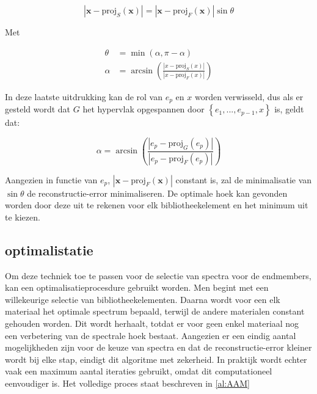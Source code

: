 \documentclass[12pt]{report}
\newcommand{\proj}[2]{\text{proj}_{#2}\left(#1\right)}
\begin{document}
\begin{equation}
\left| \bm{x} - \proj{\bm{x}}{S}\right|  = \left| \bm{x} - \proj{\bm{x}}{F}\right| \sin \theta
\end{equation}

Met 

\begin{align}
\theta &= \min(\alpha, \pi-\alpha) \\
\alpha &= \arcsin \left(\frac{\left|x - \proj{x}{S}\right|}{\left|x - \proj{x}{F}\right|}\right)
\end{align}

In deze laatste uitdrukking kan de rol van $e_p$ en $x$ worden verwisseld, dus als er gesteld wordt dat $G$ het hypervlak opgespannen door $\left\{ e_1 , ... ,e_{p-1}, x \right\}$ is, geldt dat:

\begin{equation}
\alpha = \arcsin \left(\frac{\left|e_p - \proj{e_p}{G}\right|}{\left|e_p - \proj{e_p}{F}\right|}\right)
\end{equation} 

Aangezien in functie van $e_p$, $\left| \bm{x} - \proj{\bm{x}}{F}\right|$ constant is, zal de minimalisatie van $\sin \theta$ de reconstructie-error minimaliseren. De optimale hoek kan gevonden worden door deze uit te rekenen voor elk bibliotheekelement en het minimum uit te kiezen.

\subsection{optimalistatie}

Om deze techniek toe te passen voor de selectie van spectra voor de endmembers, kan een optimalisatieprocesdure gebruikt worden. Men begint met een willekeurige selectie van bibliotheekelementen. Daarna wordt voor een elk materiaal het optimale spectrum bepaald, terwijl de andere materialen constant gehouden worden. Dit wordt herhaalt, totdat er voor geen enkel materiaal nog een verbetering van de spectrale hoek bestaat. Aangezien er een eindig aantal mogelijkheden zijn voor de keuze van spectra en dat de reconstructie-error kleiner wordt bij elke stap, eindigt dit algoritme met zekerheid. In praktijk wordt echter vaak een maximum aantal iteraties gebruikt, omdat dit computationeel eenvoudiger is. Het volledige proces staat beschreven in \ref{al:AAM}
\end{document}
